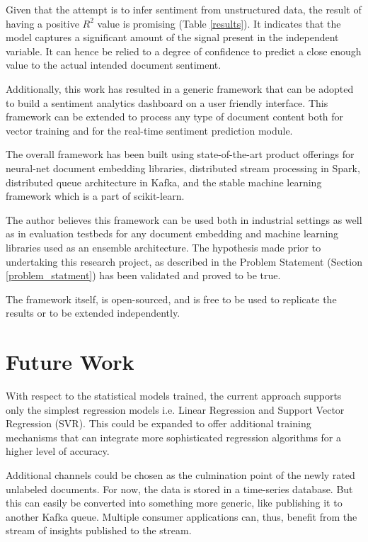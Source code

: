 \documentclass[conference]{IEEEtran}
\begin{document}
    Given that the attempt is to infer sentiment from unstructured data, the result of having a positive $R^2$ value is promising (Table \ref{results}).
    It indicates that the model captures a significant amount of the signal present in the independent variable.
    It can hence be relied to a degree of confidence to predict a close enough value to the actual intended document sentiment.

    Additionally, this work has resulted in a generic framework that can be adopted to build a sentiment analytics dashboard on a user friendly interface. 
    This framework can be extended to process any type of document content both for vector training and for the real-time sentiment prediction module.

    The overall framework has been built using state-of-the-art product offerings for neural-net document embedding libraries, distributed stream processing in Spark, distributed queue architecture in Kafka, and the stable machine learning framework which is a part of scikit-learn. 

    The author believes this framework can be used both in industrial settings as well as in evaluation testbeds for any document embedding and machine learning libraries used as an ensemble architecture. The hypothesis made prior to undertaking this research project, as described in the Problem Statement (Section \ref{problem_statment}) has been validated and proved to be true.

    The framework itself, is open-sourced, and is free to be used to replicate the results or to be extended independently\cite{rapid_rate}.

\vspace{5mm}

\section{Future Work} \label{future_work}
    With respect to the statistical models trained, the current approach supports only the simplest regression models i.e. Linear Regression and Support Vector Regression (SVR). 
    This could be expanded to offer additional training mechanisms that can integrate more sophisticated regression algorithms for a higher level of accuracy.
     
    Additional channels could be chosen as the culmination point of the newly rated unlabeled documents.
    For now, the data is stored in a time-series database.
    But this can easily be converted into something more generic, like publishing it to another Kafka queue.
    Multiple consumer applications can, thus, benefit from the stream of insights published to the stream.
\end{document}
